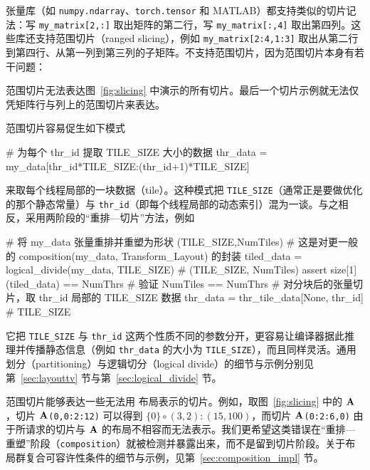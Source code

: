 张量库（如 {\tt numpy.ndarray}、{\tt torch.tensor} 和 MATLAB）都支持类似的切片记法：写 {\tt my\_matrix[2\allowbreak{},:]} 取出矩阵的第二行，写 {\tt my\_matrix[:,\allowbreak{}4]} 取出第四列。这些库还支持范围切片（ranged slicing），例如 {\tt my\_matrix[2:4\allowbreak{},1:3]} 取出从第二行到第四行、从第一列到第三列的子矩阵。\CuTe 不支持范围切片，因为范围切片本身有若干问题：
\begin{compactitem}
\item 范围切片无法表达图~\ref{fig:slicing} 中演示的所有切片。最后一个切片示例就无法仅凭矩阵行与列上的范围切片来表达。
\item 范围切片容易促生如下模式
\begin{python}
# 为每个 thr_id 提取 TILE_SIZE 大小的数据
thr_data = my_data[thr_id*TILE_SIZE:(thr_id+1)*TILE_SIZE]
\end{python}
来取每个线程局部的一块数据（tile）。这种模式把 {\tt TILE\_SIZE}（通常正是要做优化的那个静态常量）与 {\tt thr\_id}（即每个线程局部的动态索引）混为一谈。与之相反，\CuTe 采用两阶段的“重排—切片”方法，例如
\begin{python}
# 将 my_data 张量重排并重塑为形状 (TILE_SIZE,NumTiles)
# 这是对更一般的 composition(my_data, Transform_Layout) 的封装
tiled_data = logical_divide(my_data, TILE_SIZE)  # (TILE_SIZE, NumTiles)
assert size[1](tiled_data) == NumThrs            # 验证 NumTiles == NumThrs
# 对分块后的张量切片，取 thr_id 局部的 TILE_SIZE 数据
thr_data = thr_tile_data[None, thr_id]           # TILE_SIZE
\end{python}
它把 {\tt TILE\_SIZE} 与 {\tt thr\_id} 这两个性质不同的参数分开，更容易让编译器据此推理并传播静态信息（例如 {\tt thr\_data} 的大小为 {\tt TILE\_SIZE}），而且同样灵活。通用划分（partitioning）与逻辑切分（logical divide）的细节与示例分别见第~\ref{sec:layouttv} 节与第~\ref{sec:logical_divide} 节。
\item 范围切片能够表达一些无法用 \CuTe 布局表示的切片。例如，取图~\ref{fig:slicing} 中的 $\mathbf{A}$，切片 {\tt $\mathbf{A}$(0,0:2:12)} 可以得到 $\{0\} \circ (3,2):(15,100)$，而切片 {\tt $\mathbf{A}$(0:2:6,0)} 由于所请求的切片与 $\mathbf{A}$ 的布局不相容而无法表示。我们更希望这类错误在“重排—重塑”阶段（{\tt composition}）就被检测并暴露出来，而不是留到切片阶段。关于布局群复合可容许性条件的细节与示例，见第~\ref{sec:composition_impl} 节。
\end{compactitem}
